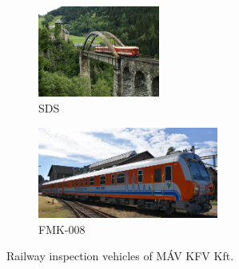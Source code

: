 \begin{figure}[!ht]
    \centering
    \begin{subfigure}{0.45\textwidth}
        \centering
        \includegraphics[height=3cm]{./tex_images/sds.jpg}
        \caption*{SDS}
    \end{subfigure}
    \begin{subfigure}{0.45\textwidth}
        \centering
        \includegraphics[height=3cm]{./tex_images/FMK008.jpg}
        \caption*{FMK-008}
    \end{subfigure}
    \caption{Railway inspection vehicles of MÁV KFV Kft.}
    \label{fig:vehicles}
\end{figure}